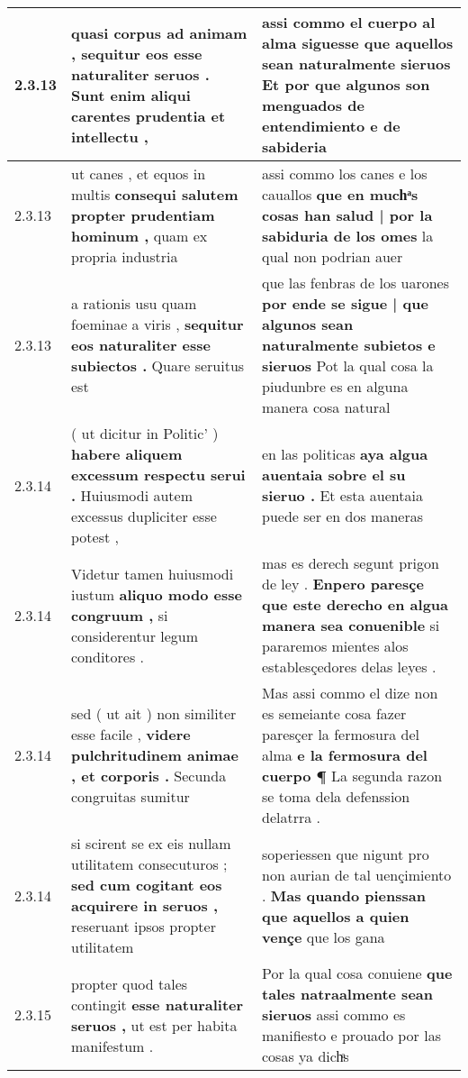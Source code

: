 \begin{tabular}{|p{1cm}|p{6.5cm}|p{6.5cm}|}
2.3.13 & quasi corpus ad animam , \textbf{ sequitur eos esse naturaliter seruos . } Sunt enim aliqui carentes prudentia et intellectu , & assi commo el cuerpo al alma siguesse \textbf{ que aquellos sean naturalmente sieruos } Et por que algunos son menguados de entendimiento e de sabideria \\\hline
2.3.13 & ut canes , et equos in multis \textbf{ consequi salutem propter prudentiam hominum , } quam ex propria industria & assi commo los canes e los cauallos \textbf{ que en muchͣs cosas han salud | por la sabiduria de los omes } la qual non podrian auer \\\hline
2.3.13 & a rationis usu quam foeminae a viris , \textbf{ sequitur eos naturaliter esse subiectos . } Quare seruitus est & que las fenbras de los uarones \textbf{ por ende se sigue | que algunos sean naturalmente subietos e sieruos } Pot la qual cosa la piudunbre es en alguna manera cosa natural \\\hline
2.3.14 & ( ut dicitur in Politic’ ) \textbf{ habere aliquem excessum respectu serui . } Huiusmodi autem excessus dupliciter esse potest , & en las politicas \textbf{ aya algua auentaia sobre el su sieruo . } Et esta auentaia puede ser en dos maneras \\\hline
2.3.14 & Videtur tamen huiusmodi iustum \textbf{ aliquo modo esse congruum , } si considerentur legum conditores . & mas es derech segunt prigon de ley . \textbf{ Enpero paresçe que este derecho en algua manera sea conuenible } si pararemos mientes alos establesçedores delas leyes . \\\hline
2.3.14 & sed ( ut ait ) non similiter esse facile , \textbf{ videre pulchritudinem animae , et corporis . } Secunda congruitas sumitur & Mas assi commo el dize non es semeiante cosa fazer paresçer la fermosura del alma \textbf{ e la fermosura del cuerpo ¶ } La segunda razon se toma dela defenssion delatrra . \\\hline
2.3.14 & si scirent se ex eis nullam utilitatem consecuturos ; \textbf{ sed cum cogitant eos acquirere in seruos , } reseruant ipsos propter utilitatem & soperiessen que nigunt pro non aurian de tal uençimiento . \textbf{ Mas quando pienssan que aquellos a quien vençe } que los gana \\\hline
2.3.15 & propter quod tales contingit \textbf{ esse naturaliter seruos , } ut est per habita manifestum . & Por la qual cosa conuiene \textbf{ que tales natraalmente sean sieruos } assi commo es manifiesto e prouado por las cosas ya dichͣs \\\hline

\end{tabular}
